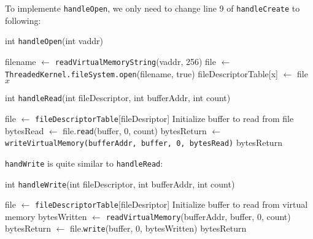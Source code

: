 \documentclass{article}
\begin{document}
\begin{spacing}{1.1}
To implemente \texttt{handleOpen}, we only need to change line 9 of \texttt{handleCreate} to following:
\begin{algorithm}
  \caption{int \texttt{handleOpen}(int vaddr)}
\begin{algorithmic}[1]
  \ENDIF
  \STATE filename $\leftarrow$ \texttt{readVirtualMemoryString}(vaddr, 256)
  \ENDIF
    \STATE \colorbox{myyellow}{file $\leftarrow$ \texttt{ThreadedKernel.fileSystem.open}(filename, true)}
    \STATE fileDescriptorTable[x] $\leftarrow$ file
    \RETURN $x$
  \ELSE
  \ENDIF
\end{algorithmic}
\end{algorithm}

\begin{algorithm}
  \caption{int \texttt{handleRead}(int fileDescriptor, int bufferAddr, int count)}
\begin{algorithmic}[1]
  \ENDIF
  \STATE file $\leftarrow$ \texttt{fileDescriptorTable}[fileDesriptor]
  \ENDIF
  \STATE Initialize buffer to read from file
  \STATE bytesRead $\leftarrow$ file.\texttt{read}(buffer, 0, count)
  \ELSE
    \STATE bytesReturn $\leftarrow$ \texttt{writeVirtualMemory(bufferAddr, buffer, 0, bytesRead)}
    \RETURN bytesReturn
  \ENDIF
\end{algorithmic}
\end{algorithm}

\texttt{handWrite} is quite similar to \texttt{handleRead}:

\begin{algorithm}
  \caption{int \texttt{handleWrite}(int fileDescriptor, int bufferAddr, int count)}
\begin{algorithmic}[1]
  \ENDIF
  \STATE file $\leftarrow$ \texttt{fileDescriptorTable}[fileDesriptor]
  \ENDIF
  \STATE Initialize buffer to read from virtual memory
  \STATE bytesWritten $\leftarrow$ \texttt{readVirtualMemory}(bufferAddr, buffer, 0, count)
  \ENDIF
  \STATE bytesReturn $\leftarrow$ file.\texttt{write}(buffer, 0, bytesWritten)
  \ENDIF
  \RETURN bytesReturn
\end{algorithmic}
\end{algorithm}


\end{spacing}
\end{document}
